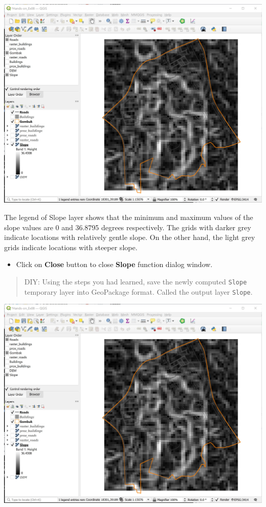 \documentclass[
  letterpaper,
  DIV=11,
  numbers=noendperiod]{scrreprt}
\providecommand{\tightlist}{%
  \setlength{\itemsep}{0pt}\setlength{\parskip}{0pt}}\usepackage{longtable,booktabs,array}
\begin{document}
\includegraphics{./img07/image29.jpg}

The legend of Slope layer shows that the minimum and maximum values of
the slope values are 0 and 36.8795 degrees respectively. The grids with
darker grey indicate locations with relatively gentle slope. On the
other hand, the light grey grids indicate locations with steeper slope.

\begin{itemize}
\tightlist
\item
  Click on \textbf{Close} button to close \textbf{Slope} function dialog
  window.
\end{itemize}

\begin{quote}
DIY: Using the steps you had learned, save the newly computed
\texttt{Slope} temporary layer into GeoPackage format. Called the output
layer \texttt{Slope}.
\end{quote}

\includegraphics{./img07/image29.jpg}
\end{document}
